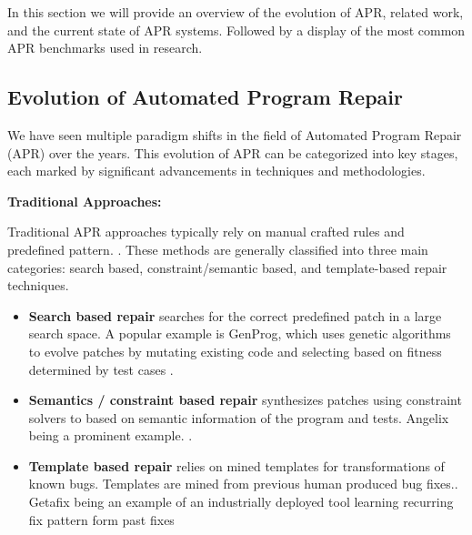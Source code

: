 In this section we will provide an overview of the evolution of APR, related work, and the current state of APR systems. Followed by a display of the most common APR benchmarks used in research.

\subsection{Evolution of Automated Program Repair} \label{subsection:evolution-apr}

We have seen multiple paradigm shifts in the field of Automated Program Repair (APR) over the years. This evolution of APR can be categorized into key stages, each marked by significant advancements in techniques and methodologies.

\textbf{Traditional Approaches:}

Traditional APR approaches typically rely on manual crafted rules and predefined pattern. \cite{liuMarsCodeAgentAInative2024, xiaAutomatedProgramRepair2023,yinThinkRepairSelfDirectedAutomated2024}. These methods are generally classified into three main categories: search based, constraint/semantic based, and template-based repair techniques.
\begin{itemize}
    \item\textbf{Search based repair} searches for the correct predefined patch in a large search space. \cite{liuMarsCodeAgentAInative2024, huCanGPTO1Kill2024,zhangPATCHEmpoweringLarge2025} A popular example is GenProg, which uses genetic algorithms to evolve patches by mutating existing code and selecting based on fitness determined by test cases \cite{legouesGenProgGenericMethod2012}.

    \item\textbf{Semantics / constraint based repair} synthesizes patches using constraint solvers to based on semantic information of the program and tests. \cite{liuMarsCodeAgentAInative2024, mechtaevAngelixScalableMultiline2016} Angelix being a prominent example. \cite{mechtaevAngelixScalableMultiline2016}.

    \item\textbf{Template based repair} relies on mined templates for transformations of known bugs. \cite{xiaAutomatedProgramRepair2023} Templates are mined from previous human produced bug fixes.\cite{xiaAutomatedProgramRepair2023, yinThinkRepairSelfDirectedAutomated2024}. Getafix being an example of an industrially deployed tool learning recurring fix pattern form past fixes \cite{baderGetafixLearningFix2019}
\end{itemize}

